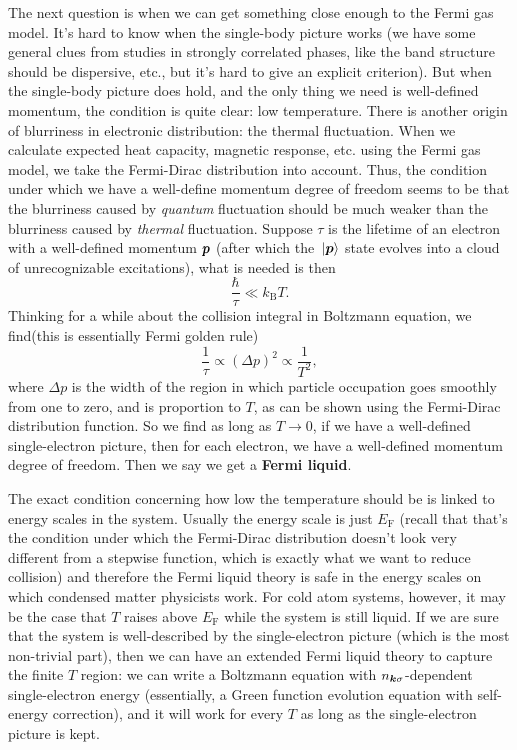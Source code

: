 \documentclass[hyperref, a4paper]{article}
\newcommand*{\concept}[1]{{\textbf{#1}}}
\newcommand*{\kB}{k_{\text{B}}}
\newcommand*{\efermi}{E_{\text{F}}}
\begin{document}
The next question is when we can get something close enough to the Fermi gas model.
It's hard to know when the single-body picture works 
(we have some general clues from studies in strongly correlated phases, 
like the band structure should be dispersive, etc., 
but it's hard to give an explicit criterion).
But when the single-body picture does hold, 
and the only thing we need is well-defined momentum, 
the condition is quite clear: 
low temperature.
There is another origin of blurriness in electronic distribution:
the thermal fluctuation.
When we calculate expected heat capacity, magnetic response, etc. 
using the Fermi gas model, 
we take the Fermi-Dirac distribution into account. 
Thus, the condition under which we have a well-define momentum degree of freedom 
seems to be that 
the blurriness caused by \emph{quantum} fluctuation 
should be much weaker than the blurriness caused by \emph{thermal} fluctuation.
Suppose $\tau$ is the lifetime of an electron with a well-defined momentum $\vb*{p}$
(after which the $\ket*{\vb*{p}}$ state evolves into 
a cloud of unrecognizable excitations), 
what is needed is then 
\begin{equation}
    \frac{\hbar}{\tau} \ll \kB T.
\end{equation}
Thinking for a while about the collision integral 
in Boltzmann equation, 
we find(this is essentially Fermi golden rule)
\begin{equation}
    \frac{1}{\tau} \propto (\Delta p)^2 \propto \frac{1}{T^2}, 
\end{equation}
where $\Delta p$ is the width 
of the region in which particle occupation goes smoothly from one to zero, 
and is proportion to $T$, 
as can be shown using the Fermi-Dirac distribution function.
So we find as long as $T \to 0$, 
if we have a well-defined single-electron picture,
then for each electron, we have a well-defined momentum degree of freedom.
Then we say we get a \concept{Fermi liquid}.

The exact condition concerning how low the temperature should be 
is linked to energy scales in the system.
Usually the energy scale is just $\efermi$
(recall that that's the condition 
under which the Fermi-Dirac distribution doesn't look very different
from a stepwise function, 
which is exactly what we want to reduce collision) 
and therefore the Fermi liquid theory is safe 
in the energy scales on which condensed matter physicists work.
For cold atom systems, however, 
it may be the case that $T$ raises above $\efermi$ 
while the system is still liquid.
If we are sure that the system is well-described 
by the single-electron picture
(which is the most non-trivial part), 
then we can have an extended Fermi liquid theory to capture the finite $T$ region:
we can write a Boltzmann equation with 
$n_{\vb*{k} \sigma}$-dependent single-electron energy 
(essentially, a Green function evolution equation with self-energy correction),
and it will work for every $T$ as long as the single-electron picture is kept.
\end{document}
